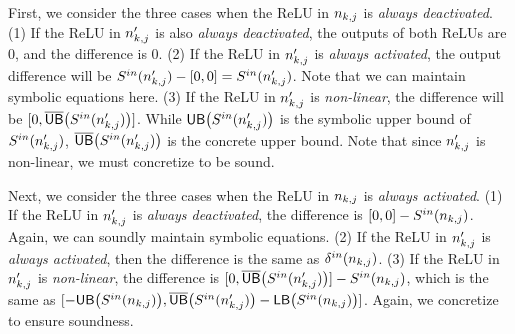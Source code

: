 \begin{algorithm}
{{{                 } 
         }
}

\end{algorithm}


First, we consider the three cases when the ReLU in $n_{k,j}$ is
\emph{always deactivated}.
%
(1) If the ReLU in $ n'_{k,j} $ is also \emph{always deactivated}, the
outputs of both ReLUs are 0, and the difference is 0.
%
(2) If the ReLU in $ n'_{k,j} $ is \emph{always activated}, the output
difference will be $S^{in}(n'_{k,j}) - [0,0] = S^{in}(n'_{k,j})$.  Note that
we can maintain symbolic equations here.
%
(3) If the ReLU in $ n'_{k,j} $ is \emph{non-linear}, the
difference will be $[0, \overline{\mathsf{UB}}\big(S^{in}(n'_{k,j})\big)] $.
%
While $\mathsf{UB}\big(S^{in}(n'_{k,j})\big)$ is the symbolic upper bound of
$S^{in}(n'_{k,j})$, $\overline{\mathsf{UB}}\big(S^{in}(n'_{k,j})\big)$ is the
concrete upper bound. Note that since $ n'_{k,j} $ is non-linear,
we must concretize to be sound.

Next, we consider the three cases when the ReLU in $n_{k,j}$ is
\emph{always activated}.
%
(1) If the ReLU in $n'_{k,j}$ is \emph{always deactivated},  the
difference is $[0,0] - S^{in}(n_{k,j})$. Again, we can soundly
maintain symbolic equations.
%
(2) If the ReLU in $n'_{k,j}$ is \emph{always activated}, then the
difference is the same as $\delta^{in}(n_{k,j})$.
%
(3) If the ReLU in $n'_{k,j}$ is \emph{non-linear},  the
difference is $[0, \overline{\mathsf{UB}}\big(S^{in}(n'_{k,j})\big)] -
S^{in}(n_{k,j})$, which is  the same as
$[-\mathsf{UB}\big(S^{in}(n_{k,j})\big), \overline{\mathsf{UB}}\big(S^{in}(n'_{k,j})\big)
- \mathsf{LB}\big(S^{in}(n_{k,j})\big)]$. Again, we concretize to ensure
soundness.


